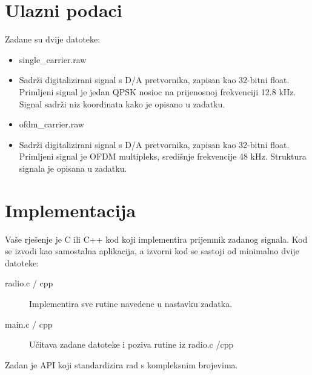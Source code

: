 \documentclass[a4paper]{article}
\begin{document}
\section{Ulazni podaci}
Zadane su dvije datoteke:
\begin{itemize}
\item single\_carrier.raw
\item[] Sadrži digitalizirani signal s D/A pretvornika, zapisan kao 32-bitni float. Primljeni signal je jedan QPSK nosioc na prijenosnoj frekvenciji 12.8 kHz. Signal sadrži niz koordinata kako je opisano u zadatku.
\item ofdm\_carrier.raw
\item[] Sadrži digitalizirani signal s D/A pretvornika, zapisan kao 32-bitni float. Primljeni signal je OFDM multipleks, središnje frekvencije 48 kHz. Struktura signala je opisana u zadatku.
\end{itemize}

\section{Implementacija}

Vaše rješenje je C ili C++ kod koji implementira prijemnik zadanog signala. Kod se izvodi kao samostalna aplikacija, a izvorni kod se sastoji od minimalno dvije datoteke:
\begin{description}
	\item[radio.c / cpp] Implementira sve rutine navedene u nastavku zadatka.
	\item[main.c / cpp] Učitava zadane datoteke i poziva rutine iz radio.c /cpp
\end{description}
Zadan je API koji standardizira rad s kompleksnim brojevima.
\end{document}

